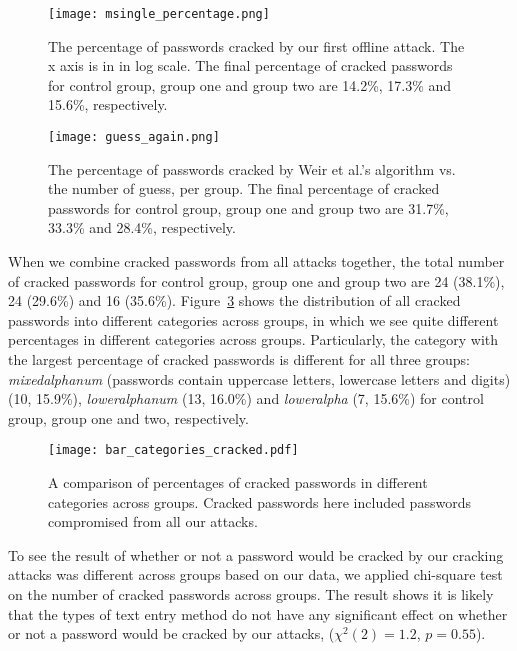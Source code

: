 \documentclass[conference]{IEEEtran}
\begin{document}
\begin{figure}
\texttt{[image: msingle\_percentage.png]}
\caption{\label{fig:msingle_percentage} The percentage of passwords cracked by our first offline attack. The x axis is in in log scale.
The final percentage of cracked passwords for control group, group one and group two are 14.2\%, 17.3\% and 15.6\%, respectively.}
\vspace{-9pt}
\end{figure}

\begin{figure}
\texttt{[image: guess\_again.png]}
\caption{\label{fig:guess_again} The percentage of passwords cracked by Weir et al.'s algorithm vs. the number of guess, per group. The final percentage of cracked passwords for control group, group one and group two are 31.7\%, 33.3\% and 28.4\%, respectively.}
\vspace{-9pt}
\end{figure}


When we combine cracked passwords from all attacks together, the total number of cracked passwords for control group, group one and group two are 24 (38.1\%), 24 (29.6\%) and 16 (35.6\%). Figure~\ref{fig:bar_categories_cracked} shows the distribution of all cracked passwords into different categories across groups, in which we see quite different percentages in different categories across groups. Particularly, the category with the largest percentage of cracked passwords is different for all three groups: \emph{mixedalphanum} (passwords contain uppercase letters, lowercase letters and digits) (10, 15.9\%), \emph{loweralphanum} (13, 16.0\%) and \emph{loweralpha} (7, 15.6\%) for control group, group one and two, respectively.


\begin{figure}[tbph]
\texttt{[image: bar\_categories\_cracked.pdf]}
\caption{\label{fig:bar_categories_cracked} A comparison of percentages of cracked passwords in different categories across groups. Cracked passwords here included passwords compromised from all our attacks.}
\vspace{-9pt}
\end{figure}

To see the result of whether or not a password would be cracked by our cracking attacks was different across groups based on our data, we applied chi-square test on the number of cracked passwords across groups. The result shows it is likely that the types of text entry method do not have any significant effect on whether or not a password would be cracked by our attacks, ($\chi^{2}(2)=1.2$, $p=0.55$).
\end{document}
